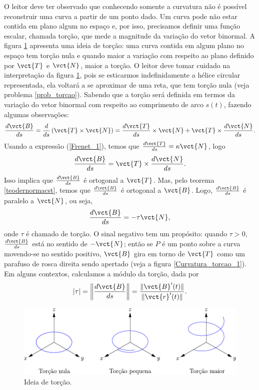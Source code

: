 O leitor deve ter observado que conhecendo somente a curvatura não é possível reconstruir uma curva a partir de um ponto dado. Um curva pode não estar contida em plano algum no espaço e, por isso, precisamos definir uma função escalar, chamada torção, que mede a magnitude da variação do vetor binormal. A figura \ref{torcao} apresenta uma ideia de torção: uma curva contida em algum plano no espaço tem torção nula e quando maior a variação com respeito ao plano definido por $\vct{T}$ e $\vct{N}$, maior a torção. O leitor deve tomar cuidado na interpretação da figura \ref{torcao}, pois se esticarmos indefinidamente a hélice circular representada, ela voltará a se aproximar de uma reta, que tem torção nula (veja problema \ref{prob_torcao}). Sabendo que a torção será definida em termos da variação do vetor binormal com respeito ao comprimento de arco $s(t)$, fazendo algumas observações:
$$
\frac{d\vct{B}}{ds}=\frac{d}{ds}\left(\vct{T}\times\vct{N}\right)=\frac{d\vct{T}}{ds}\times \vct{N}+\vct{T}\times\frac{d\vct{N}}{ds}.
$$
Usando a expressão (\ref{Frenet_1}), temos que $\frac{d\vct{T}}{ds}=\kappa\vct{N}$, logo 
$$
\frac{d\vct{B}}{ds}=\vct{T}\times\frac{d\vct{N}}{ds}.
$$
Isso implica que $\frac{d\vct{B}}{ds}$ é ortogonal a $\vct{T}$. Mas, pelo teorema \ref{teodernormacst}, temos que $\frac{d\vct{B}}{ds}$ é ortogonal a $\vct{B}$. Logo, $\frac{d\vct{B}}{ds}$ é paralelo a $\vct{N}$, ou seja,
\begin{equation}{\label{Frenet_2}}
\frac{d\vct{B}}{ds}=-\tau\vct{N},
\end{equation}
onde $\tau$ é chamado de torção. O sinal negativo tem um propósito: quando $\tau>0$, $\frac{d\vct{B}}{ds}$ está no sentido de $-\vct{N}$; então se $P$ é um ponto sobre a curva movendo-se no sentido positivo, $\vct{B}$ gira em torno de $\vct{T}$ como um parafuso de rosca direita sendo apertado (veja a figura \ref{Curvatura_torcao_1}). Em alguns contextos, calculamos a módulo da torção, dada por
$$
|\tau|=\left\|\frac{d\vct{B}}{ds}\right\|=\frac{\|\vct{B}'(t)\|}{\|\vct{r}'(t)\|}.
$$


\begin{figure}
\begin{center}
    \includegraphics{./cap_curvas/figs/exemplos_de_torcao}
 \caption{Ideia de torção.}\label{torcao}
  \end{center}
\end{figure}



